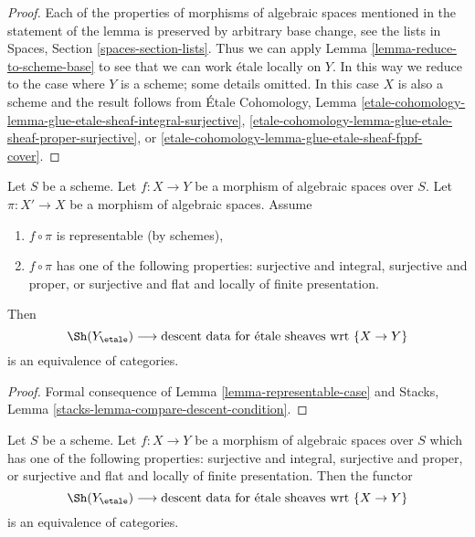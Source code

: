 \begin{proof}
Each of the properties of morphisms of algebraic spaces
mentioned in the statement of the lemma is preserved by
arbitrary base change, see the lists in
Spaces, Section \ref{spaces-section-lists}.
Thus we can apply Lemma \ref{lemma-reduce-to-scheme-base}
to see that we can work \'etale locally on $Y$.
In this way we reduce to the case where $Y$ is a scheme;
some details omitted. In this case $X$ is also a scheme
and the result follows from \'Etale Cohomology, Lemma
\ref{etale-cohomology-lemma-glue-etale-sheaf-integral-surjective},
\ref{etale-cohomology-lemma-glue-etale-sheaf-proper-surjective}, or
\ref{etale-cohomology-lemma-glue-etale-sheaf-fppf-cover}.
\end{proof}

\begin{lemma}
\label{lemma-reduce-to-scheme-source}
Let $S$ be a scheme. Let $f : X \to Y$ be a morphism of algebraic spaces
over $S$. Let $\pi : X' \to X$ be a morphism of algebraic spaces. Assume
\begin{enumerate}
\item $f \circ \pi$ is representable (by schemes),
\item $f \circ \pi$ has one of the following properties:
surjective and integral,
surjective and proper, or
surjective and flat and locally of finite presentation.
\end{enumerate}
Then 
$$
\Sh(Y_\etale)
\longrightarrow
\text{descent data for \'etale sheaves wrt }\{X \to Y\}
$$
is an equivalence of categories.
\end{lemma}

\begin{proof}
Formal consequence of Lemma \ref{lemma-representable-case}
and Stacks, Lemma \ref{stacks-lemma-compare-descent-condition}.
\end{proof}

\begin{lemma}
\label{lemma-glue-etale-sheaf-proper-surjective}
Let $S$ be a scheme. Let $f : X \to Y$ be a morphism of
algebraic spaces over $S$ which has one of the following
properties: surjective and integral, surjective and proper, or
surjective and flat and locally of finite presentation. Then the functor
$$
\Sh(Y_\etale)
\longrightarrow
\text{descent data for \'etale sheaves wrt }\{X \to Y\}
$$
is an equivalence of categories.
\end{lemma}

